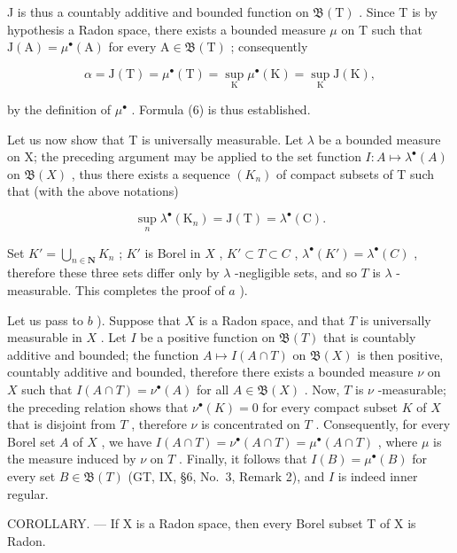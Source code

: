 J is thus a countably additive and bounded function on \(\mathfrak{B}(\mathrm{T})\) . Since T is by hypothesis a Radon space, there exists a bounded measure \(\mu\) on T such that \(\mathrm{J}(\mathrm{A}) = \mu^{\bullet}(\mathrm{A})\) for every \(\mathrm{A} \in \mathfrak{B}(\mathrm{T})\) ; consequently

\[
\alpha = \mathrm{J} (\mathrm{T}) = \mu^ {\bullet} (\mathrm{T}) = \sup _ {\mathrm{K}} \mu^ {\bullet} (\mathrm{K}) = \sup _ {\mathrm{K}} \mathrm{J} (\mathrm{K}),
\]

by the definition of \(\mu^{\bullet}\) . Formula (6) is thus established.

Let us now show that T is universally measurable. Let \(\lambda\) be a bounded measure on X; the preceding argument may be applied to the set function \(I: A \mapsto \lambda^{\bullet}(A)\) on \(\mathfrak{B}(X)\) , thus there exists a sequence \((K_{n})\) of compact subsets of T such that (with the above notations)

\[
\sup _ {n} \lambda^ {\bullet} (\mathrm{K} _ {n}) = \mathrm{J} (\mathrm{T}) = \lambda^ {\bullet} (\mathrm{C}).
\]

Set \(K' = \bigcup_{n \in \mathbf{N}} K_n\) ; \(K'\) is Borel in \(X\) , \(K' \subset T \subset C\) , \(\lambda^\bullet(K') = \lambda^\bullet(C)\) , therefore these three sets differ only by \(\lambda\) -negligible sets, and so \(T\) is \(\lambda\) -measurable. This completes the proof of \(a\) ).

Let us pass to \(b\) ). Suppose that \(X\) is a Radon space, and that \(T\) is universally measurable in \(X\) . Let \(I\) be a positive function on \(\mathfrak{B}(T)\) that is countably additive and bounded; the function \(A \mapsto I(A \cap T)\) on \(\mathfrak{B}(X)\) is then positive, countably additive and bounded, therefore there exists a bounded measure \(\nu\) on \(X\) such that \(I(A \cap T) = \nu^{\bullet}(A)\) for all \(A \in \mathfrak{B}(X)\) . Now, \(T\) is \(\nu\) -measurable; the preceding relation shows that \(\nu^{\bullet}(K) = 0\) for every compact subset \(K\) of \(X\) that is disjoint from \(T\) , therefore \(\nu\) is concentrated on \(T\) . Consequently, for every Borel set \(A\) of \(X\) , we have \(I(A \cap T) = \nu^{\bullet}(A \cap T) = \mu^{\bullet}(A \cap T)\) , where \(\mu\) is the measure induced by \(\nu\) on \(T\) . Finally, it follows that \(I(B) = \mu^{\bullet}(B)\) for every set \(B \in \mathfrak{B}(T)\) (GT, IX, §6, No.~3, Remark 2), and \(I\) is indeed inner regular.

COROLLARY. --- If X is a Radon space, then every Borel subset T of X is Radon.

